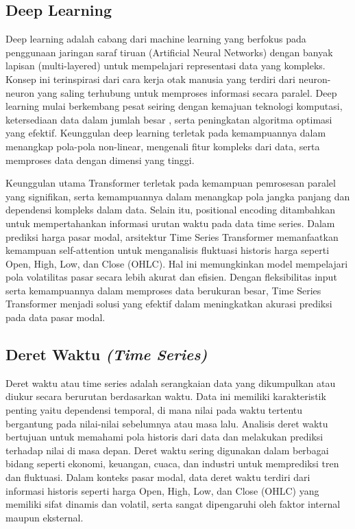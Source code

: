 \subsection{Deep Learning }
Deep learning adalah cabang dari machine learning yang berfokus pada penggunaan jaringan saraf tiruan (Artificial Neural Networks) dengan banyak lapisan (multi-layered) untuk mempelajari representasi data yang kompleks. Konsep ini terinspirasi dari cara kerja otak manusia yang terdiri dari neuron-neuron yang saling terhubung untuk memproses informasi secara paralel\autocite{lecun2015deep}. Deep learning mulai berkembang pesat seiring dengan kemajuan teknologi komputasi, ketersediaan data dalam jumlah besar , serta peningkatan algoritma optimasi yang efektif. Keunggulan deep learning terletak pada kemampuannya dalam menangkap pola-pola non-linear, mengenali fitur kompleks dari data, serta memproses data dengan dimensi yang tinggi\autocite{goodfellow2016deep}.

Keunggulan utama Transformer terletak pada kemampuan pemrosesan paralel yang signifikan, serta kemampuannya dalam menangkap pola jangka panjang dan dependensi kompleks dalam data\autocite{hochreiter1997long}. Selain itu, positional encoding ditambahkan untuk mempertahankan informasi urutan waktu pada data time series. Dalam prediksi harga pasar modal, arsitektur Time Series Transformer memanfaatkan kemampuan self-attention untuk menganalisis fluktuasi historis harga seperti Open, High, Low, dan Close (OHLC). Hal ini memungkinkan model mempelajari pola volatilitas pasar secara lebih akurat dan efisien. Dengan fleksibilitas input serta kemampuannya dalam memproses data berukuran besar, Time Series Transformer menjadi solusi yang efektif dalam meningkatkan akurasi prediksi pada data pasar modal.

\subsection{Deret Waktu \textit{(Time Series)}}
Deret waktu atau time series adalah serangkaian data yang dikumpulkan atau diukur secara berurutan berdasarkan waktu. Data ini memiliki karakteristik penting yaitu dependensi temporal, di mana nilai pada waktu tertentu bergantung pada nilai-nilai sebelumnya atau masa lalu. Analisis deret waktu bertujuan untuk memahami pola historis dari data dan melakukan prediksi terhadap nilai di masa depan\autocite{box2015time}. Deret waktu sering digunakan dalam berbagai bidang seperti ekonomi, keuangan, cuaca, dan industri untuk memprediksi tren dan fluktuasi. Dalam konteks pasar modal, data deret waktu terdiri dari informasi historis seperti harga Open, High, Low, dan Close (OHLC) yang memiliki sifat dinamis dan volatil, serta sangat dipengaruhi oleh faktor internal maupun eksternal.

